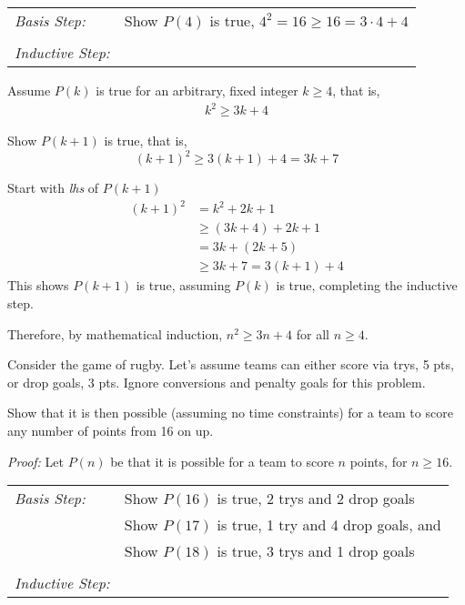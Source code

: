 \begin{questions}
\begin{solution}
  \smallskip
  \begin{tabular}{lp{4in}}
    \textit{Basis Step:} & Show $P(4)$ is true, $4^2 = 16 \geq 16 = 3\cdot 4 + 4$ \\
     & \\
   \textit{Inductive Step:} &  \\
  \end{tabular}

  Assume $P(k)$ is true for an arbitrary, fixed integer $k \geq 4$, that is, 
  \begin{align*}
    k^2 \geq 3k + 4 \tag{IH} 
  \end{align*}

  Show $P(k+1)$ is true, that is, 
  \[ (k+1)^2 \geq 3(k+1) + 4 = 3k + 7 \]

  Start with \textit{lhs} of $P(k+1)$
  \begin{align*}
    (k+1)^2 &= k^2 + 2k + 1 \\
     &\geq (3k + 4) + 2k + 1 \tag{IH} \\
     &= 3k + (2k + 5) \\
     &\geq 3k + 7 = 3(k+1) + 4
  \end{align*}
  This shows $P(k+1)$ is true, assuming $P(k)$ is true, completing the inductive step. 

  Therefore, by mathematical induction, $n^2 \geq 3n + 4$ for all $n \geq 4$.
\end{solution}


 Consider the game of rugby.  Let's assume teams can either score via trys, 5 pts, or drop goals, 3 pts.   Ignore conversions and penalty goals for this problem.  

Show that it is then possible (assuming no time constraints) for a team to score any number of points from 16 on up. 
    \ifprintanswers
        \vspace{-10pt}
   \fi
\begin{solution}
  \textit{Proof:}
  Let $P(n)$ be that it is possible for a team to score $n$ points, for $n \geq 16$.
  
  \smallskip
  \begin{tabular}{lp{4in}}
    \textit{Basis Step:}  & Show $P(16)$ is true, 2 trys and 2 drop goals \\
                & Show $P(17)$ is true, 1 try and 4 drop goals, and \\
                & Show $P(18)$ is true, 3 trys and 1 drop goals \\
     & \\
   \textit{Inductive Step:} &  \\
  \end{tabular}


\end{solution}
\end{questions}
